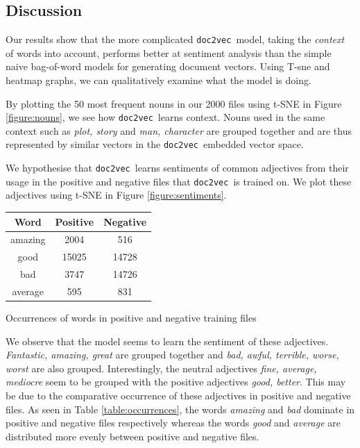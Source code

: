 \documentclass[12pt]{article}
\newcommand{\docvec}{\texttt{doc2vec}}
\begin{document}
\begin{multicols}{2}
\section{Discussion}

Our results show that the more complicated \docvec~model, taking the \emph{context} of words into account, performs better at sentiment analysis than the simple naive bag-of-word models for generating document vectors. Using T-sne and heatmap graphs, we can qualitatively examine what the model is doing.

By plotting the 50 most frequent nouns in our 2000 files using t-SNE in Figure \ref{figure:nouns}, we see how \docvec~learns context. Nouns used in the same context such as \emph{plot, story} and \emph{man, character} are grouped together and are thus represented by similar vectors in the \docvec~embedded vector space.

We hypothesise that \docvec~learns sentiments of common adjectives from their usage in the positive and negative files that \docvec~is trained on. We plot these adjectives using t-SNE in Figure \ref{figure:sentiments}.

\begin{tablehere}
\centering
 \begin{tabular}{| c | c | c|}  
 \hline
Word & Positive & Negative \\ [0.5ex] 
 \hline\hline
 amazing & 2004 & 516 \\
 \hline
 good & 15025 & 14728 \\ 
 \hline
bad & 3747 & 14726 \\
 \hline
average & 595 & 831 \\
 \hline
\end{tabular}
\caption{Occurrences of words in positive and negative training files} \label{table:occurrences}
\end{tablehere}

We observe that the model seems to learn the sentiment of these adjectives. \emph{Fantastic, amazing, great} are grouped together and \emph{bad, awful, terrible, worse, worst} are also grouped. Interestingly, the neutral adjectives \emph{fine, average, mediocre} seem to be grouped with the positive adjectives \emph{good, better}. This may be due to the comparative occurrence of these adjectives in positive and negative files. As seen in Table \ref{table:occurrences}, the words \emph{amazing} and \emph{bad} dominate in positive and negative files respectively whereas the words \emph{good} and \emph{average} are distributed more evenly between positive and negative files.


\end{multicols}
\end{document}
